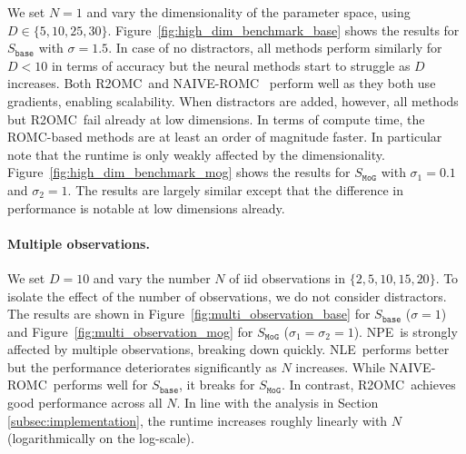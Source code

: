 \documentclass[twoside]{article}
\newcommand{\rromc}{R2OMC}
\newcommand{\nromc}{NAIVE-ROMC}
\newcommand{\NPE}{NPE}
\newcommand{\NLE}{NLE}
\newcommand{\CtwoST}{\texttt{C2ST}}
\begin{document}
We set $N=1$ and vary the dimensionality of the parameter space, using $D \in \{5, 10, 25, 30\}$. Figure~\ref{fig:high_dim_benchmark_base} shows the results for $S_{\mathtt{base}}$ with $\sigma=1.5$.
In case of no distractors, all methods perform similarly for $D<10$ in terms of accuracy but the neural methods start to struggle as $D$ increases. Both \rromc~and \nromc~ perform well as they both use gradients, enabling scalability. When distractors are added, however, all methods but \rromc~fail already at low dimensions. In terms of compute time, the ROMC-based methods are at least an order of magnitude faster. In particular note that the runtime is only weakly affected by the dimensionality. 
Figure~\ref{fig:high_dim_benchmark_mog} shows the results for $S_{\mathtt{MoG}}$ with $\sigma_1 = 0.1$ and $\sigma_2=1$. The results are largely similar except that the difference in performance is notable at low dimensions already.


\paragraph{Multiple observations.}
\label{subsec:gaussian-multi-obs}
We set $D=10$ and vary the number $N$ of iid observations in $\{2, 5, 10, 15, 20\}$. To isolate the effect of the number of observations, we do not consider distractors. 
The results are shown in Figure~\ref{fig:multi_observation_base} for $S_{\mathtt{base}}$ ($\sigma=1$) and Figure~\ref{fig:multi_observation_mog} for $S_{\mathtt{MoG}}$ ($\sigma_1=\sigma_2=1$). 
\NPE~is strongly affected by multiple observations, breaking down quickly. \NLE~performs better but the performance deteriorates significantly as $N$ increases. While \nromc~performs well for $S_{\mathtt{base}}$, it breaks for $S_{\mathtt{MoG}}$. In contrast, \rromc~achieves good performance across all $N$. In line with the analysis in Section \ref{subsec:implementation}, the runtime increases roughly linearly with $N$ (logarithmically on the log-scale).
\end{document}
